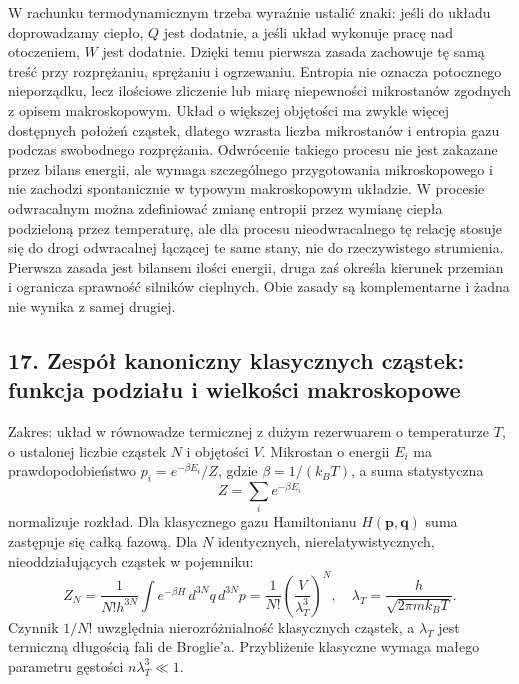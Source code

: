 \documentclass[11pt,a4paper]{article}
\begin{document}
W rachunku termodynamicznym trzeba wyraźnie ustalić znaki: jeśli do układu doprowadzamy ciepło, \(Q\) jest dodatnie, a jeśli układ wykonuje pracę nad otoczeniem, \(W\) jest dodatnie. Dzięki temu pierwsza zasada zachowuje tę samą treść przy rozprężaniu, sprężaniu i ogrzewaniu. Entropia nie oznacza potocznego nieporządku, lecz ilościowe zliczenie lub miarę niepewności mikrostanów zgodnych z opisem makroskopowym. Układ o większej objętości ma zwykle więcej dostępnych położeń cząstek, dlatego wzrasta liczba mikrostanów i entropia gazu podczas swobodnego rozprężania. Odwrócenie takiego procesu nie jest zakazane przez bilans energii, ale wymaga szczególnego przygotowania mikroskopowego i nie zachodzi spontanicznie w typowym makroskopowym układzie. W procesie odwracalnym można zdefiniować zmianę entropii przez wymianę ciepła podzieloną przez temperaturę, ale dla procesu nieodwracalnego tę relację stosuje się do drogi odwracalnej łączącej te same stany, nie do rzeczywistego strumienia. Pierwsza zasada jest bilansem ilości energii, druga zaś określa kierunek przemian i ogranicza sprawność silników cieplnych. Obie zasady są komplementarne i żadna nie wynika z samej drugiej.
\subsection{17. Zespół kanoniczny klasycznych cząstek: funkcja podziału i wielkości makroskopowe}
Zakres: układ w równowadze termicznej z dużym rezerwuarem o temperaturze \(T\), o ustalonej liczbie cząstek \(N\) i objętości \(V\). Mikrostan o energii \(E_i\) ma prawdopodobieństwo \(p_i=e^{-\beta E_i}/Z\), gdzie \(\beta=1/(k_BT)\), a suma statystyczna
\[
Z=\sum_i e^{-\beta E_i}
\]
normalizuje rozkład. Dla klasycznego gazu Hamiltonianu \(H(\mathbf p,\mathbf q)\) suma zastępuje się całką fazową. Dla \(N\) identycznych, nierelatywistycznych, nieoddziałujących cząstek w pojemniku:
\[
Z_N=\frac{1}{N!h^{3N}}\int e^{-\beta H}\,d^{3N}q\,d^{3N}p
=\frac{1}{N!}\left(\frac{V}{\lambda_T^3}\right)^N,\quad
\lambda_T=\frac{h}{\sqrt{2\pi m k_BT}}.
\]
Czynnik \(1/N!\) uwzględnia nierozróżnialność klasycznych cząstek, a \(\lambda_T\) jest termiczną długością fali de Broglie’a. Przybliżenie klasyczne wymaga małego parametru gęstości \(n\lambda_T^3\ll1\).
\end{document}
